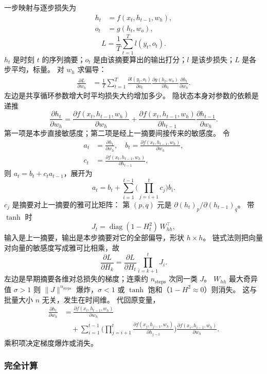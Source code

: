 一步映射与逐步损失为
\begin{align*}
h_t&=f(x_t,h_{t-1},w_h),
\\
o_t&=g(h_t,w_o),
\end{align*}
\[
L=\frac{1}{T}\sum_{t=1}^{T}l(y_t,o_t).
\]
$h_t$ 是时刻 $t$ 的序列摘要；$o_t$ 是由该摘要算出的输出打分；$l$ 是该步损失；$L$ 是各步平均，标量。
对 $w_h$ 求偏导：
\begin{align*}
\frac{\partial L}{\partial w_h}
&=
\frac{1}{T}\sum_{t=1}^{T}
\frac{\partial l(y_t,o_t)}{\partial o_t}
\frac{\partial g(h_t,w_o)}{\partial h_t}
\frac{\partial h_t}{\partial w_h}.
\end{align*}
左边是共享循环参数增大时平均损失大约增加多少。
隐状态本身对参数的依赖是递推
\[
\frac{\partial h_t}{\partial w_h}
=
\frac{\partial f(x_t,h_{t-1},w_h)}{\partial w_h}
+
\frac{\partial f(x_t,h_{t-1},w_h)}{\partial h_{t-1}}
\frac{\partial h_{t-1}}{\partial w_h}.
\]
第一项是本步直接敏感度；第二项是经上一摘要间接传来的敏感度。
令
\begin{align*}
a_t&=\frac{\partial h_t}{\partial w_h},
\quad
b_t=\frac{\partial f(x_t,h_{t-1},w_h)}{\partial w_h},
\\
c_t&=\frac{\partial f(x_t,h_{t-1},w_h)}{\partial h_{t-1}},
\end{align*}
则 $a_t=b_t+c_t a_{t-1}$，展开为
\[
a_t=b_t+\sum_{i=1}^{t-1}\Biggl(\prod_{j=i+1}^{t}c_j\Biggr)b_i.
\]
$c_j$ 是摘要对上一摘要的雅可比矩阵：
第 $(p,q)$ 元是 $\partial (h_t)_p/\partial (h_{t-1})_q$。
带 $\tanh$ 时
\[
J_t=\operatorname{diag}(1-H_t^{2})\,W_{hh}^{\top},
\]
输入是上一摘要，输出是本步摘要对它的全部偏导，形状 $h\times h$。
链式法则把向量对向量的敏感度写成雅可比相乘，故
\[
\frac{\partial L}{\partial H_k}
=
\frac{\partial L}{\partial H_t}
\prod_{i=k+1}^{t}J_i.
\]
左边是早期摘要各维对总损失的梯度；连乘约 $n_{\mathrm{steps}}$ 次同一类 $J$。
$W_{hh}$ 最大奇异值 $\sigma>1$ 则 $\|J\|^{n_{\mathrm{steps}}}$ 爆炸，$\sigma<1$ 或 $\tanh$ 饱和（$1-H^{2}\approx 0$）则消失。
这与批量大小 $n$ 无关，发生在时间维。
代回原变量，
\begin{align*}
\frac{\partial h_t}{\partial w_h}
&=
\frac{\partial f(x_t,h_{t-1},w_h)}{\partial w_h}
\\
&\quad+
\sum_{i=1}^{t-1}
\Biggl(
\prod_{j=i+1}^{t}
\frac{\partial f(x_j,h_{j-1},w_h)}{\partial h_{j-1}}
\Biggr)
\frac{\partial f(x_i,h_{i-1},w_h)}{\partial w_h}.
\end{align*}
乘积项决定梯度爆炸或消失。

\subsubsection{完全计算}

